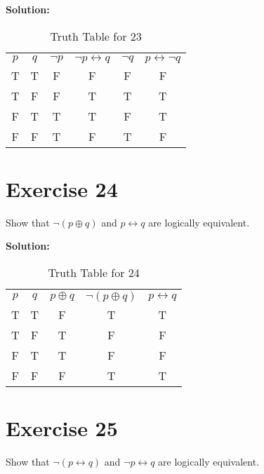 \documentclass{Axon}
\begin{document}
\noindent
\textbf{Solution:}
\begin{table}[ht]
    \centering
    \begin{tabular}{c|c|c|c|c|c}
        \(p\) & \(q\) & \(\lnot p\) & \(\lnot p \leftrightarrow q\) & \(\lnot q\) & \(p \leftrightarrow \lnot q\) \\
        T     & T     & F           & F                             & F           & F                             \\
        T     & F     & F           & T                             & T           & T                             \\
        F     & T     & T           & T                             & F           & T                             \\
        F     & F     & T           & F                             & T           & F
    \end{tabular}
    \caption{Truth Table for 23}
\end{table}

\section*{Exercise 24}
Show that \(\lnot(p \oplus q)\) and \(p \leftrightarrow q\) are logically equivalent.

\noindent
\textbf{Solution:}
\begin{table}[ht]
    \centering
    \begin{tabular}{c|c|c|c|c}
        \(p\) & \(q\) & \(p \oplus q\) & \(\lnot(p \oplus q)\) & \(p \leftrightarrow q\) \\
        T     & T     & F              & T                     & T                       \\
        T     & F     & T              & F                     & F                       \\
        F     & T     & T              & F                     & F                       \\
        F     & F     & F              & T                     & T
    \end{tabular}
    \caption{Truth Table for 24}
\end{table}

\section*{Exercise 25}
Show that \(\lnot(p \leftrightarrow q)\) and \(\lnot p \leftrightarrow q\) are logically equivalent.
\end{document}

